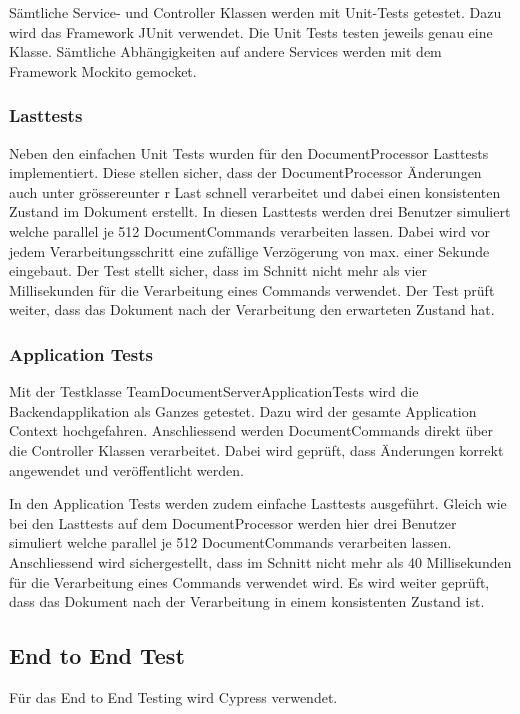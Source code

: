 Sämtliche Service- und Controller Klassen werden mit Unit-Tests getestet.
Dazu wird das Framework JUnit verwendet.
Die Unit Tests testen jeweils genau eine Klasse.
Sämtliche Abhängigkeiten auf andere Services werden mit dem Framework Mockito gemocket.

\subsubsection{Lasttests}

Neben den einfachen Unit Tests wurden für den DocumentProcessor Lasttests implementiert.
Diese stellen sicher, dass der DocumentProcessor Änderungen auch unter grössereunter r Last schnell verarbeitet und dabei einen konsistenten Zustand im Dokument erstellt.
In diesen Lasttests werden drei Benutzer simuliert welche parallel je 512 DocumentCommands verarbeiten lassen.
Dabei wird vor jedem Verarbeitungsschritt eine zufällige Verzögerung von max. einer Sekunde eingebaut.
Der Test stellt sicher, dass im Schnitt nicht mehr als vier Millisekunden für die Verarbeitung eines Commands verwendet.
Der Test prüft weiter, dass das Dokument nach der Verarbeitung den erwarteten Zustand hat.

\subsubsection{Application Tests}

Mit der Testklasse TeamDocumentServerApplicationTests wird die Backendapplikation als Ganzes getestet.
Dazu wird der gesamte Application Context hochgefahren.
Anschliessend werden DocumentCommands direkt über die Controller Klassen verarbeitet.
Dabei wird geprüft, dass Änderungen korrekt angewendet und veröffentlicht werden.

In den Application Tests werden zudem einfache Lasttests ausgeführt.
Gleich wie bei den Lasttests auf dem DocumentProcessor werden hier drei Benutzer simuliert welche parallel je 512 DocumentCommands verarbeiten lassen.
Anschliessend wird sichergestellt, dass im Schnitt nicht mehr als 40 Millisekunden für die Verarbeitung eines Commands verwendet wird.
Es wird weiter geprüft, dass das Dokument nach der Verarbeitung in einem konsistenten Zustand ist.



\subsection{End to End Test}
F\"ur das End to End Testing wird Cypress verwendet.

